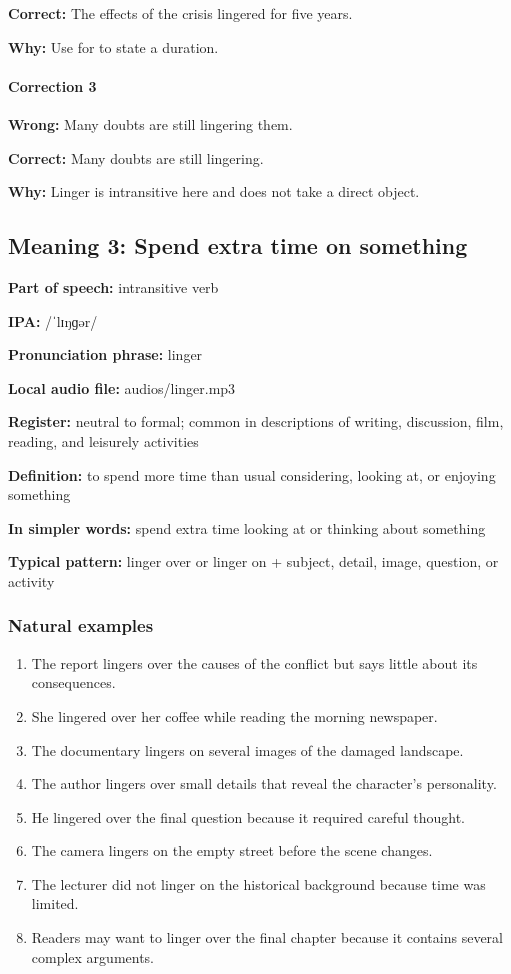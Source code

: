 \documentclass[11pt]{article}
\begin{document}
\textbf{Correct:} The effects of the crisis lingered for five years.

\textbf{Why:} Use for to state a duration.

\paragraph{Correction 3}
\textbf{Wrong:} Many doubts are still lingering them.

\textbf{Correct:} Many doubts are still lingering.

\textbf{Why:} Linger is intransitive here and does not take a direct object.

\subsection{Meaning 3: Spend extra time on something}
\textbf{Part of speech:} intransitive verb

\textbf{IPA:} /ˈlɪŋɡər/

\textbf{Pronunciation phrase:} linger

\textbf{Local audio file:} audios/linger.mp3

\textbf{Register:} neutral to formal; common in descriptions of writing, discussion, film, reading, and leisurely activities

\textbf{Definition:} to spend more time than usual considering, looking at, or enjoying something

\textbf{In simpler words:} spend extra time looking at or thinking about something

\textbf{Typical pattern:} linger over or linger on + subject, detail, image, question, or activity

\subsubsection{Natural examples}
\begin{enumerate}
  \item The report lingers over the causes of the conflict but says little about its consequences.
  \item She lingered over her coffee while reading the morning newspaper.
  \item The documentary lingers on several images of the damaged landscape.
  \item The author lingers over small details that reveal the character's personality.
  \item He lingered over the final question because it required careful thought.
  \item The camera lingers on the empty street before the scene changes.
  \item The lecturer did not linger on the historical background because time was limited.
  \item Readers may want to linger over the final chapter because it contains several complex arguments.
\end{enumerate}
\end{document}
